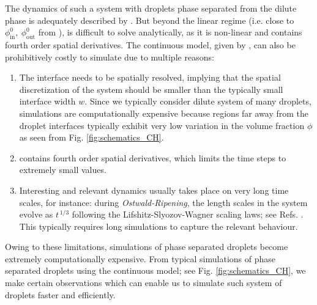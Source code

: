 The dynamics of such a system with droplets phase separated from the dilute phase is adequately described by .
But beyond the linear regime (i.e. close to $\phi^0_\mathrm{in}, ~\phi^0_\mathrm{out}$ from ),  is difficult to solve analytically, as it is non-linear and contains fourth order spatial derivatives.
The continuous model, given by , can also be prohibitively costly to simulate due to multiple reasons:
\begin{enumerate}
    \item The interface needs to be spatially resolved, implying that the spatial discretization of the system should be smaller than the typically small interface width $w$.
    Since we typically consider dilute system of many droplets, simulations are computationally expensive because regions far away from the droplet interfaces typically exhibit very low variation in the volume fraction $\phi$ as seen from Fig. \ref{fig:schematics_CH}.
    
    \item {} contains fourth order spatial derivatives, which limits the time steps to extremely small values.
    
    \item Interesting and relevant dynamics usually takes place on very long time scales, for instance: during \textit{Ostwald-Ripening}, the length scales in the system evolve as $t^{\,1/3}$ following the Lifshitz-Slyozov-Wagner scaling laws; see Refs. \cite{Lifshitz,Wagner}.
    This typically requires long simulations to capture the relevant behaviour.
\end{enumerate}
Owing to these limitations, simulations of phase separated droplets become extremely computationally expensive.
From typical simulations of phase separated droplets using the continuous model; see Fig. \ref{fig:schematics_CH}, we make certain observations which can enable us to simulate such system of droplets faster and efficiently.

\clearpage

